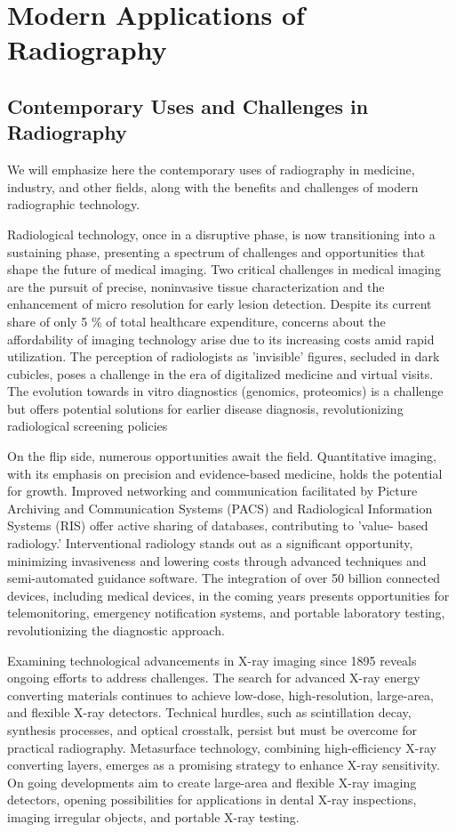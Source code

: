 \documentclass[a4paper,12pt]{report}
\begin{document}
\chapter{Modern Applications of Radiography}
\section{Contemporary Uses and Challenges in Radiography}
We will emphasize here the contemporary uses of radiography in medicine, industry, and other fields, along with the benefits and challenges of modern radiographic technology.

Radiological technology, once in a disruptive phase, is now transitioning into a sustaining phase,
presenting a spectrum of challenges and opportunities that shape the future of medical imaging.
Two critical challenges in medical imaging are the pursuit of precise, noninvasive tissue
characterization and the enhancement of micro resolution for early lesion detection. Despite its
current share of only 5 \% of total healthcare expenditure, concerns about the affordability of
imaging technology arise due to its increasing costs amid rapid utilization. The perception of
radiologists as 'invisible' figures, secluded in dark cubicles, poses a challenge in the era of
digitalized medicine and virtual visits. The evolution towards in vitro diagnostics (genomics,
proteomics) is a challenge but offers potential solutions for earlier disease diagnosis,
revolutionizing radiological screening policies

On the flip side, numerous opportunities await the field. Quantitative imaging, with its emphasis
on precision and evidence-based medicine, holds the potential for growth. Improved networking
and communication facilitated by Picture Archiving and Communication Systems (PACS) and
Radiological Information Systems (RIS) offer active sharing of databases, contributing to 'value-
based radiology.' Interventional radiology stands out as a significant opportunity, minimizing
invasiveness and lowering costs through advanced techniques and semi-automated guidance
software. The integration of over 50 billion connected devices, including medical devices, in the
coming years presents opportunities for telemonitoring, emergency notification systems, and
portable laboratory testing, revolutionizing the diagnostic approach.

Examining technological advancements in X-ray imaging since 1895 reveals ongoing efforts to
address challenges. The search for advanced X-ray energy converting materials continues to
achieve low-dose, high-resolution, large-area, and flexible X-ray detectors. Technical hurdles, such
as scintillation decay, synthesis processes, and optical crosstalk, persist but must be overcome for
practical radiography. Metasurface technology, combining high-efficiency X-ray converting
layers, emerges as a promising strategy to enhance X-ray sensitivity. On going developments aim
to create large-area and flexible X-ray imaging detectors, opening possibilities for applications in
dental X-ray inspections, imaging irregular objects, and portable X-ray testing.
\end{document}
